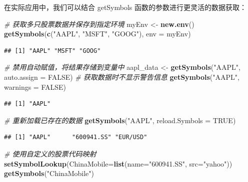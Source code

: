 \documentclass[]{ctexbook}
\newenvironment{Shaded}{\begin{snugshade}}{\end{snugshade}}
\newcommand{\AttributeTok}[1]{\textcolor[rgb]{0.13,0.29,0.53}{#1}}
\newcommand{\CommentTok}[1]{\textcolor[rgb]{0.56,0.35,0.01}{\textit{#1}}}
\newcommand{\ConstantTok}[1]{\textcolor[rgb]{0.56,0.35,0.01}{#1}}
\newcommand{\FunctionTok}[1]{\textcolor[rgb]{0.13,0.29,0.53}{\textbf{#1}}}
\newcommand{\NormalTok}[1]{#1}
\newcommand{\OtherTok}[1]{\textcolor[rgb]{0.56,0.35,0.01}{#1}}
\newcommand{\StringTok}[1]{\textcolor[rgb]{0.31,0.60,0.02}{#1}}
\begin{document}
在实际应用中，我们可以结合 getSymbols 函数的参数进行更灵活的数据获取：

\begin{Shaded}
\begin{Highlighting}[]
\CommentTok{\# 获取多只股票数据并保存到指定环境}
\NormalTok{myEnv }\OtherTok{\textless{}{-}} \FunctionTok{new.env}\NormalTok{()}
\FunctionTok{getSymbols}\NormalTok{(}\FunctionTok{c}\NormalTok{(}\StringTok{"AAPL"}\NormalTok{, }\StringTok{"MSFT"}\NormalTok{, }\StringTok{"GOOG"}\NormalTok{), }\AttributeTok{env =}\NormalTok{ myEnv)}
\end{Highlighting}
\end{Shaded}

\begin{verbatim}
## [1] "AAPL" "MSFT" "GOOG"
\end{verbatim}

\begin{Shaded}
\begin{Highlighting}[]
\CommentTok{\# 禁用自动赋值，将结果存储到变量中}
\NormalTok{aapl\_data }\OtherTok{\textless{}{-}} \FunctionTok{getSymbols}\NormalTok{(}\StringTok{"AAPL"}\NormalTok{, }\AttributeTok{auto.assign =} \ConstantTok{FALSE}\NormalTok{)}
\CommentTok{\# 获取数据时不显示警告信息}
\FunctionTok{getSymbols}\NormalTok{(}\StringTok{"AAPL"}\NormalTok{, }\AttributeTok{warnings =} \ConstantTok{FALSE}\NormalTok{)}
\end{Highlighting}
\end{Shaded}

\begin{verbatim}
## [1] "AAPL"
\end{verbatim}

\begin{Shaded}
\begin{Highlighting}[]
\CommentTok{\# 重新加载已存在的数据}
\FunctionTok{getSymbols}\NormalTok{(}\StringTok{"AAPL"}\NormalTok{, }\AttributeTok{reload.Symbols =} \ConstantTok{TRUE}\NormalTok{)}
\end{Highlighting}
\end{Shaded}

\begin{verbatim}
## [1] "AAPL"      "600941.SS" "EUR/USD"
\end{verbatim}

\begin{Shaded}
\begin{Highlighting}[]
\CommentTok{\# 使用自定义的股票代码映射}
\FunctionTok{setSymbolLookup}\NormalTok{(}\AttributeTok{ChinaMobile=}\FunctionTok{list}\NormalTok{(}\AttributeTok{name=}\StringTok{"600941.SS"}\NormalTok{, }\AttributeTok{src=}\StringTok{"yahoo"}\NormalTok{))}
\FunctionTok{getSymbols}\NormalTok{(}\StringTok{"ChinaMobile"}\NormalTok{)}
\end{Highlighting}
\end{Shaded}
\end{document}
